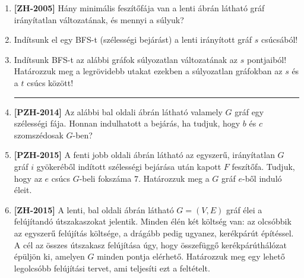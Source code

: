 \documentclass[a4paper,12pt]{article}
\begin{document}
\begin{enumerate}
        \item \textbf{[ZH-2005]} Hány minimális feszítőfája van a lenti ábrán látható gráf irányítatlan változatának, és mennyi a súlyuk?
        \begin{figure}[!h]
            \centering
            
        \end{figure}

        \item Indítsunk el egy BFS-t (szélességi bejárást) a lenti irányított gráf $s$ csúcsából!
        \begin{figure}[!h]
            \centering
            
        \end{figure}

        \item Indítsunk BFS-t az alábbi gráfok súlyozatlan változatának az $s$ pontjaiból! Határozzuk meg a legrövidebb utakat ezekben a súlyozatlan gráfokban az $s$ és a $t$ csúcs között!
        \begin{figure}[!h]
            \centering \hfill
            \hfill
            \hfill \hfill
        \end{figure}

        \hrule

        \item \textbf{[PZH-2014]} Az alábbi bal oldali ábrán látható valamely $G$ gráf egy szélességi fája. Honnan indulhatott a bejárás, ha tudjuk, hogy $b$ és $c$ szomszédosak $G$-ben?
        
        \begin{minipage}{6in}
            \centering
            \raisebox{-0.5\height}{} \hspace{1in}
            \raisebox{-0.5\height}{}
        \end{minipage}
        
        \item \textbf{[PZH-2015]} A fenti jobb oldali ábrán látható az egyszerű, irányítatlan $G$ gráf $i$ gyökeréből indított szélességi bejárása után kapott $F$ feszítőfa. Tudjuk, hogy az $e$ csúcs $G$-beli fokszáma $7$. Határozzuk meg a $G$ gráf $e$-ből induló éleit.

        \item \textbf{[ZH-2015]} A lenti, bal oldali ábrán látható $G = (V, E)$ gráf élei a felújítandó útszakaszokat jelentik. Minden élén két költség van: az olcsóbbik az egyszerű felújítás költsége, a drágább pedig ugyanez, kerékpárút építéssel. A cél az összes útszakasz felújítása úgy, hogy összefüggő kerékpárúthálózat épüljön ki, amelyen $G$ minden pontja elérhető. Határozzuk meg egy lehető legolcsóbb felújítási tervet, ami teljesíti ezt a feltételt.
        

\end{enumerate}
\end{document}
